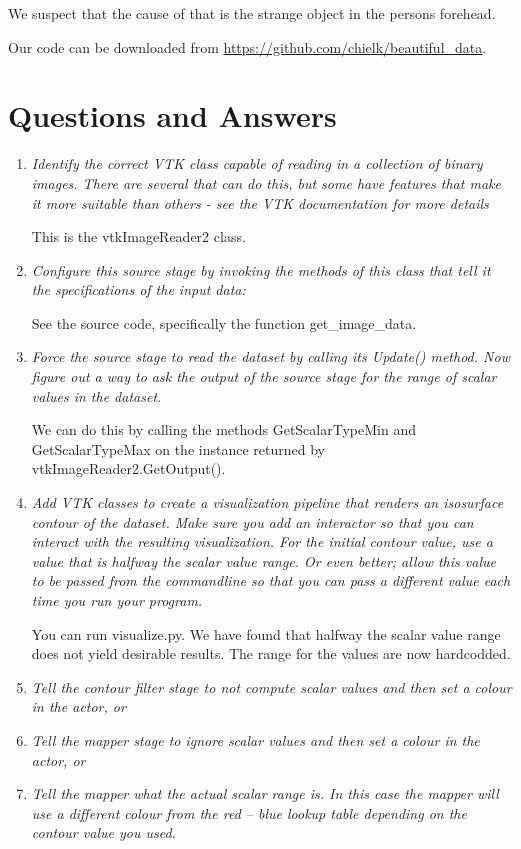\documentclass{article}[10pt]
\begin{document}
We suspect that the cause of that is the strange object in the persons forehead.

Our code can be downloaded from \url{https://github.com/chielk/beautiful\_data}.

\section{Questions and Answers}
\begin{enumerate}
    \item \textit{Identify the correct VTK class capable of reading in a
collection of binary images. There are several that can do this, but some have
features that make it more suitable than others - see the VTK documentation for
more details}

This is the \textsf{vtkImageReader2} class.

    \item \textit{Configure this source stage by invoking the methods of this
class that tell it the specifications of the input data:}

See the source code, specifically the function \textsf{get\_image\_data}.

    \item \textit{Force the source stage to read the dataset by calling its
			\textsf{Update()} method. Now figure out a way to ask the output of
		the source stage for the range of scalar values in the dataset.}

We can do this by calling the methods \textsf{GetScalarTypeMin} and
\textsf{GetScalarTypeMax} on the instance returned by
\textsf{vtkImageReader2.GetOutput()}.

    \item \textit{Add VTK classes to create a visualization pipeline that
renders an isosurface contour of the dataset. Make sure you add an interactor so
that you can interact with the resulting visualization. For the initial contour
value, use a value that is halfway the scalar value range.  Or even better;
allow this value to be passed from the commandline so that you can pass a
different value each time you run your program.}

You can run \textsf{visualize.py}. We have found that halfway the scalar value
range does not yield desirable results. The range for the values are now
hardcodded.

    \item \textit{Tell the contour filter stage to not compute scalar values and
then set a colour in the actor, or}
    \item \textit{Tell the mapper stage to ignore scalar values and then set
a colour in the actor, or}
    \item \textit{Tell the mapper what the actual scalar range is. In this
case the mapper will use a different colour from the red – blue lookup table
depending on the contour value you used.}


\end{enumerate}
\end{document}
